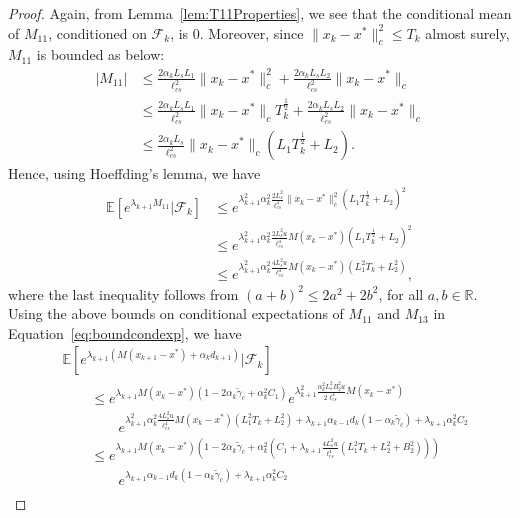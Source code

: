 \documentclass{article}
\newcommand{\lrp}[1]{\left( #1 \right)}
\newcommand{\lrs}[1]{\left[ #1 \right]}
\newcommand{\E}[1]{\mathbb{E}\lrs{#1}}
\newcommand{\R}{\mathbb{R}}
\newcommand{\lcs}{\ell_{cs}}
\newcommand{\xk}{x_k}
\begin{document}
\begin{proof}
    Again, from Lemma~\ref{lem:T11Properties}, we see that the conditional mean of $M_{11}$, conditioned on $\mathcal F_k$, is $0$. Moreover, since $\|x_k-x^*\|_c^2 \leq T_k$ almost surely, $M_{11}$ is bounded as below:
    \begin{align*} |M_{11}| &\le \frac{2\alpha_k L_s L_1}{\lcs^2}\|\xk- x^*\|^2_c + \frac{2\alpha_k L_s L_2}{\lcs^2}\|\xk-x^*\|_c \\
    &\le \frac{2\alpha_k L_s L_1}{\lcs^2}\|\xk- x^*\|_c T^\frac{1}{2}_k + \frac{2\alpha_k L_s L_2}{\lcs^2}\|\xk-x^*\|_c \\
    &\le \frac{2\alpha_k L_s}{\lcs^2}\|\xk- x^*\|_c  \lrp{L_1 T^\frac{1}{2}_k + L_2}. 
    \end{align*}
    Hence, using Hoeffding's lemma, we have
    \begin{align*}
    \E{e^{\lambda_{k+1} M_{11}} \big| \mathcal F_k} 
        &\le e^{\lambda^2_{k+1}\alpha^2_k \frac{2 L^2_s}{\lcs^4}\|x_k - x^*\|^2_c\lrp{L_1 T^\frac{1}{2}_k + L_2}^2}\\
        &\le e^{ \lambda^2_{k+1} \alpha^2_k 
        \frac{2L^2_s u}{\lcs^4} M(x_k - x^*) \lrp{L_1 T^\frac{1}{2}_k + L_2}^2 }\\
        &\le e^{ \lambda^2_{k+1} \alpha^2_k \frac{4 L^2_s u }{\lcs^4}   M(x_k - x^*) \lrp{L^2_1 T_k + L^2_2} },
    \end{align*}
    where the last inequality follows from $(a+b)^2 \le 2a^2 + 2b^2$, for all $a,b\in \R$.  Using the above bounds on conditional expectations of $M_{11}$ and $M_{13}$  in Equation~\eqref{eq:boundcondexp}, we have    
    \begin{align*}
        &\E{ e^{\lambda_{k+1}\lrp{M(x_{k+1} - x^*) + \alpha_k d_{k+1}}} \big| \mathcal F_k } \\
        &\qquad\le e^{\lambda_{k+1} M(\xk - x^*) \lrp{1 - 2\alpha_k\tilde{\gamma}_c + \alpha^2_k C_1 }} e^{\lambda^2_{k+1} \frac{\alpha^2_k L^2_s B^2_2 u}{2\lcs^4} M(\xk - x^*) } \\
        &\qquad\qquad e^{\lambda^2_{k+1} \alpha^2_k \frac{4 L^2_s u }{\lcs^4}   M(x_k - x^*) \lrp{L^2_1 T_k+ L^2_2}  + \lambda_{k+1}\alpha_{k-1}d_k (1-\alpha_k \tilde{\gamma}_c) + \lambda_{k+1}\alpha^2_k C_2}\\
        &\qquad \le  e^{\lambda_{k+1} M(\xk - x^*) \lrp{1 - 2\alpha_k\tilde{\gamma}_c + \alpha^2_k \lrp{  C_1 + \lambda_{k+1}  \frac{4 L^2_s u}{\lcs^4}\lrp{L^2_1 T_k + L^2_2 + B^2_2 } }}} \\
        &\qquad\qquad e^{\lambda_{k+1}\alpha_{k-1}d_k (1-\alpha_k \tilde{\gamma}_c) + \lambda_{k+1}\alpha^2_k C_2}\\

\end{align*}
\end{proof}
\end{document}
